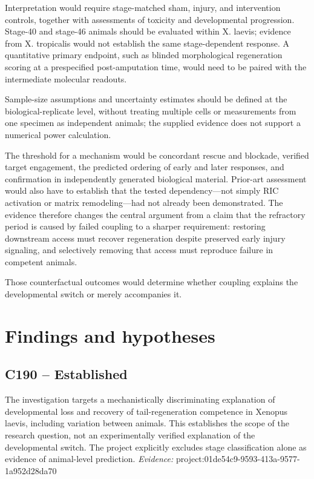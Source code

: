 \documentclass[11pt]{article}
\begin{document}
Interpretation would require stage-matched sham, injury, and intervention controls, together with assessments of toxicity and developmental progression. Stage-40 and stage-46 animals should be evaluated within X. laevis; evidence from X. tropicalis would not establish the same stage-dependent response. A quantitative primary endpoint, such as blinded morphological regeneration scoring at a prespecified post-amputation time, would need to be paired with the intermediate molecular readouts.

Sample-size assumptions and uncertainty estimates should be defined at the biological-replicate level, without treating multiple cells or measurements from one specimen as independent animals; the supplied evidence does not support a numerical power calculation.

The threshold for a mechanism would be concordant rescue and blockade, verified target engagement, the predicted ordering of early and later responses, and confirmation in independently generated biological material. Prior-art assessment would also have to establish that the tested dependency—not simply RIC activation or matrix remodeling—had not already been demonstrated. The evidence therefore changes the central argument from a claim that the refractory period is caused by failed coupling to a sharper requirement: restoring downstream access must recover regeneration despite preserved early injury signaling, and selectively removing that access must reproduce failure in competent animals.

Those counterfactual outcomes would determine whether coupling explains the developmental switch or merely accompanies it.

\section{Findings and hypotheses}
\subsection{C190 -- Established}
The investigation targets a mechanistically discriminating explanation of developmental loss and recovery of tail-regeneration competence in Xenopus laevis, including variation between animals.
This establishes the scope of the research question, not an experimentally verified explanation of the developmental switch. The project explicitly excludes stage classification alone as evidence of animal-level prediction.
\textit{Evidence: }project:01de54c9-9593-413a-9577-1a952d28da70
\end{document}
